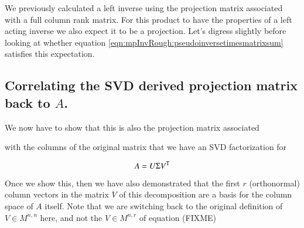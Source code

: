 We previously calculated a left inverse using the projection matrix associated with a full column rank matrix.  For this product to have the properties of a
left acting inverse we also expect it to be a projection.
Let's digress
slightly before looking at whether equation
\ref{eqn:mpInvRough:pseudoinversetimesmatrixsum} satisfies this expectation.

\subsection{Correlating the SVD derived projection matrix back to $A$. }


We now have to show that this is also the projection matrix associated

with the columns of the 
original matrix that we have an SVD factorization for

\[
A = U \Sigma V^{\text{T}}
\]

Once we show this, then we have also demonstrated that the first $r$ 
(orthonormal) column vectors in the matrix $V$ of this decomposition
are a basis for the column space of $A$ itself.  Note that we are
switching back to the original definition of $V \in M^{n,n}$ here, and
not the $V \in M^{n,r}$ of equation (FIXME)
